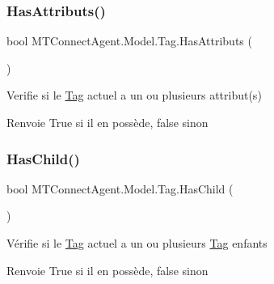 \subsubsection{\texorpdfstring{Has\+Attributs()}{HasAttributs()}}
{\footnotesize\ttfamily bool M\+T\+Connect\+Agent.\+Model.\+Tag.\+Has\+Attributs (\begin{DoxyParamCaption}{ }\end{DoxyParamCaption})\hspace{0.3cm}{\ttfamily [inline]}}



Verifie si le \mbox{\hyperlink{class_m_t_connect_agent_1_1_model_1_1_tag}{Tag}} actuel a un ou plusieurs attribut(s) 

\begin{DoxyReturn}{Renvoie}
True si il en possède, false sinon
\end{DoxyReturn}
\mbox{\label{class_m_t_connect_agent_1_1_model_1_1_tag_a0c2f62177d2c1c2db233e2adaef5a54c}} 
\subsubsection{\texorpdfstring{Has\+Child()}{HasChild()}}
{\footnotesize\ttfamily bool M\+T\+Connect\+Agent.\+Model.\+Tag.\+Has\+Child (\begin{DoxyParamCaption}{ }\end{DoxyParamCaption})\hspace{0.3cm}{\ttfamily [inline]}}



Vérifie si le \mbox{\hyperlink{class_m_t_connect_agent_1_1_model_1_1_tag}{Tag}} actuel a un ou plusieurs \mbox{\hyperlink{class_m_t_connect_agent_1_1_model_1_1_tag}{Tag}} enfants 

\begin{DoxyReturn}{Renvoie}
True si il en possède, false sinon
\end{DoxyReturn}
\mbox{\label{class_m_t_connect_agent_1_1_model_1_1_tag_ade18884a935ab5ad28d33510fa0ea4c5}} 
